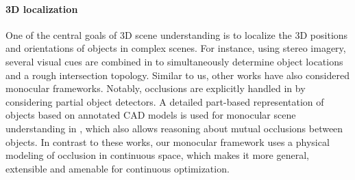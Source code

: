 
\paragraph{3D localization}
One of the central goals of 3D scene understanding is to localize the 3D positions and orientations of objects in complex scenes. For instance, using stereo imagery, several visual cues are combined in \cite{Geiger_etal_2014} to simultaneously determine object locations and a rough intersection topology. Similar to us, other works have also considered monocular frameworks. Notably, occlusions are explicitly handled in \cite{Wojek_etal_2013} by considering partial object detectors. A detailed part-based representation of objects based on annotated CAD models is used for monocular scene understanding in \cite{Zia_etal_2013,Zia_etal_2014}, which also allows reasoning about mutual occlusions between objects. In contrast to these works, our monocular framework uses a physical modeling of occlusion in continuous space, which makes it more general, extensible and amenable for continuous optimization.


